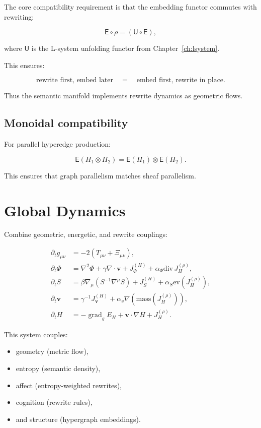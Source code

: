 The core compatibility requirement is that the embedding functor commutes with rewriting:

\[
\mathsf{E}\circ\rho
=
(\mathsf{U}\circ\mathsf{E}),
\]

where $\mathsf{U}$ is the L-system unfolding functor from Chapter~\ref{ch:lsystem}.

This ensures:

\[
\text{rewrite first, embed later}
\quad=\quad
\text{embed first, rewrite in place}.
\]

Thus the semantic manifold implements rewrite dynamics as geometric flows.


\subsection{Monoidal compatibility}

For parallel hyperedge production:

\[
\mathsf{E}(H_1 \otimes H_2)
=
\mathsf{E}(H_1)\otimes\mathsf{E}(H_2).
\]

This ensures that graph parallelism matches sheaf parallelism.


\section{Global Dynamics}

Combine geometric, energetic, and rewrite couplings:

\[
\boxed{
\begin{aligned}
\partial_t g_{\mu\nu}
&=
-2(T_{\mu\nu}+\Xi_{\mu\nu}),\\[4pt]
\partial_t \Phi
&=
\nabla^2 \Phi 
+ \gamma\nabla\cdot\mathbf{v}
+ J_\Phi^{(H)}
+ \alpha_\Phi\mathrm{div}\,J^{(\rho)}_{H},\\[4pt]
\partial_t S
&=
\beta\nabla_\mu(S^{-1}\nabla^\mu S)
+ J_{S}^{(H)}
+ \alpha_S \mathrm{ev}(J^{(\rho)}_{H}),\\[4pt]
\partial_t \mathbf{v}
&=
\gamma^{-1} J_{\mathbf{v}}^{(H)}
+ \alpha_v\nabla(\mathrm{mass}(J^{(\rho)}_{H})),\\[4pt]
\partial_t H
&=
-\operatorname{grad}_g E_H
+ \mathbf{v}\cdot\nabla H
+ J^{(\rho)}_{H}.
\end{aligned}
}
\]

This system couples:

\begin{itemize}
  \item geometry (metric flow),
  \item entropy (semantic density),
  \item affect (entropy-weighted rewrites),
  \item cognition (rewrite rules),
  \item and structure (hypergraph embeddings).
\end{itemize}


